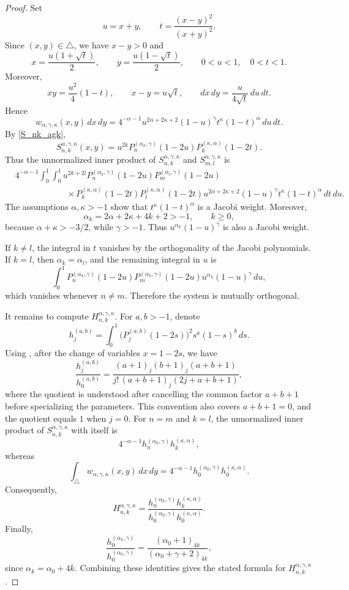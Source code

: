 \documentclass[reqno,10pt]{amsart}
\theoremstyle{plain}
\numberwithin{equation}{section}
\numberwithin{figure}{section}
\begin{document}
\begin{proof}
Set
\[
u=x+y,
\qquad
t=\frac{(x-y)^2}{(x+y)^2}.
\]
Since $(x,y)\in\triangle$, we have $x-y>0$ and
\[
x=\frac{u(1+\sqrt{t})}{2},
\qquad
y=\frac{u(1-\sqrt{t})}{2},
\qquad
0<u<1,\quad 0<t<1.
\]
Moreover,
\[
xy=\frac{u^2}{4}(1-t),
\qquad
x-y=u\sqrt{t},
\qquad
dx\,dy=\frac{u}{4\sqrt{t}}\,du\,dt.
\]
Hence
\[
w_{\alpha,\gamma,\kappa}(x,y)\,dx\,dy
=
4^{-\alpha-1}
u^{2\alpha+2\kappa+2}(1-u)^\gamma
t^\kappa(1-t)^\alpha\,du\,dt .
\]
By \eqref{S_nk_agk},
\[
S_{n,k}^{\alpha,\gamma,\kappa}(x,y)
=
u^{2k}
P_n^{(\alpha_k,\gamma)}(1-2u)
P_k^{(\kappa,\alpha)}(1-2t).
\]
Thus the unnormalized inner product of
$S_{n,k}^{\alpha,\gamma,\kappa}$ and
$S_{m,l}^{\alpha,\gamma,\kappa}$ is
\[
\begin{aligned}
&4^{-\alpha-1}
\int_0^1\int_0^1
u^{2k+2l}
P_n^{(\alpha_k,\gamma)}(1-2u)
P_m^{(\alpha_l,\gamma)}(1-2u)
\\
&\qquad\qquad\qquad\times
P_k^{(\kappa,\alpha)}(1-2t)
P_l^{(\kappa,\alpha)}(1-2t)
u^{2\alpha+2\kappa+2}(1-u)^\gamma
t^\kappa(1-t)^\alpha\,dt\,du .
\end{aligned}
\]
The assumptions \(\alpha,\kappa>-1\) show that
\(t^\kappa(1-t)^\alpha\) is a Jacobi weight. Moreover,
\[
\alpha_k
=
2\alpha+2\kappa+4k+2
>
-1,
\qquad k\geq0,
\]
because \(\alpha+\kappa>-3/2\), while \(\gamma>-1\). Thus
\(u^{\alpha_k}(1-u)^\gamma\) is also a Jacobi weight.

If $k\ne l$, the integral in $t$ vanishes by the orthogonality of the
Jacobi polynomials. If $k=l$, then $\alpha_k=\alpha_l$, and the remaining
integral in $u$ is
\[
\int_0^1
P_n^{(\alpha_k,\gamma)}(1-2u)
P_m^{(\alpha_k,\gamma)}(1-2u)
u^{\alpha_k}(1-u)^\gamma\,du,
\]
which vanishes whenever $n\ne m$. Therefore the system is mutually
orthogonal.

It remains to compute $H_{n,k}^{\alpha,\gamma,\kappa}$. For
\(a,b>-1\), denote
\[
h_j^{(a,b)}
=
\int_0^1
\bigl(P_j^{(a,b)}(1-2s)\bigr)^2s^a(1-s)^b\,ds .
\]
Using \cite[(4.3.3)]{Szego75}, after the change of variables
\(x=1-2s\), we have
\[
\frac{h_j^{(a,b)}}{h_0^{(a,b)}}
=
\frac{
(a+1)_j(b+1)_j(a+b+1)
}{
j!\,(a+b+1)_j(2j+a+b+1)
},
\]
where the quotient is understood after cancelling the common factor
\(a+b+1\) before specializing the parameters. This convention also
covers \(a+b+1=0\), and the quotient equals \(1\) when \(j=0\).
For $n=m$ and $k=l$, the unnormalized inner product of
$S_{n,k}^{\alpha,\gamma,\kappa}$ with itself is
\[
4^{-\alpha-1}h_n^{(\alpha_k,\gamma)}h_k^{(\kappa,\alpha)},
\]
whereas
\[
\int_{\triangle}w_{\alpha,\gamma,\kappa}(x,y)\,dx\,dy
=
4^{-\alpha-1}h_0^{(\alpha_0,\gamma)}h_0^{(\kappa,\alpha)}.
\]
Consequently,
\[
H_{n,k}^{\alpha,\gamma,\kappa}
=
\frac{h_n^{(\alpha_k,\gamma)}h_k^{(\kappa,\alpha)}}
{h_0^{(\alpha_0,\gamma)}h_0^{(\kappa,\alpha)}}.
\]
Finally,
\[
\frac{h_0^{(\alpha_k,\gamma)}}{h_0^{(\alpha_0,\gamma)}}
=
\frac{(\alpha_0+1)_{4k}}{(\alpha_0+\gamma+2)_{4k}},
\]
since $\alpha_k=\alpha_0+4k$. Combining these identities gives the stated
formula for $H_{n,k}^{\alpha,\gamma,\kappa}$.
\end{proof}
\end{document}
